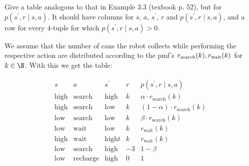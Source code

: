 \begin{exercise}
Give a table analogous to that in Example 3.3 (texbook p. 52), but for $p(s^\prime, r \mid s, a)$.
It should have columns for $s$, $a$, $s^\prime$, $r$ and $p(s^\prime, r \mid s, a)$, and a row for every $4$-tuple for which $p(s^\prime, r \mid s, a) > 0$.

\end{exercise}

\begin{solution}
We assume that the number of cans the robot collects while performing the respective action are distributed according to the pmf's $r_{\text{\text{search}}}(k), r_{\text{\text{wait}}}(k)$ for $k \in \N$. With this we get the table:

\begin{align*}
  \begin{array}{cccc|c}
  s & a & s^\prime & r & p(s^\prime, r \mid s, a) \\
  \hline
  \text{high} & \text{search} & \text{high} & k & \alpha \cdot r_{\text{search}}(k) \\
  \text{high} & \text{search} & \text{low} & k & (1 - \alpha) \cdot r_{\text{search}}(k) \\
  \text{low} & \text{search} & \text{low} & k & \beta \cdot r_{\text{search}}(k) \\
  \text{low} & \text{wait} & \text{low} & k &  r_{\text{wait}}(k) \\
  \text{high} & \text{wait} & \text{high}t & k & r_{\text{wait}}(k) \\
  \text{low} & \text{search} & \text{high} & -3 & 1- \beta \\
  \text{low} & \text{recharge} & \text{high} & 0 & 1 \\
  \end{array}
\end{align*}

\end{solution}
